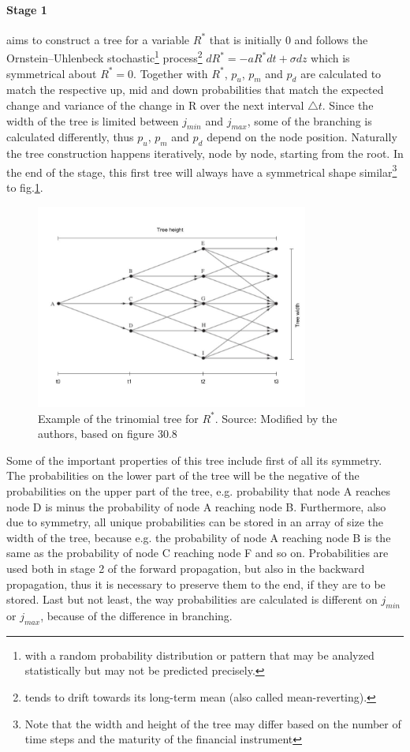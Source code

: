 \paragraph{Stage 1}
aims to construct a tree for a variable $R^*$ that is initially 0 and follows the Ornstein–Uhlenbeck stochastic\footnote{with a random probability distribution or pattern that may be analyzed statistically but may not be predicted precisely.} process\footnote{tends to drift towards its long-term mean (also called mean-reverting).} $dR^*=-aR^*dt + \sigma dz$ which is symmetrical about $R^*=0$\cite[pg.698-699]{ofod}. Together with $R^*$, $p_u$, $p_m$ and $p_d$ are calculated to match the respective up, mid and down probabilities that match the expected change and variance of the change in R over the next interval $\triangle t$. Since the width of the tree is limited between $j_{min}$ and $j_{max}$, some of the branching is calculated differently, thus $p_u$, $p_m$ and $p_d$ depend on the node position. Naturally the tree construction happens iteratively, node by node, starting from the root. In the end of the stage, this first tree will always have a symmetrical shape similar\footnote{Note that the width and height of the tree may differ based on the number of time steps and the maturity of the financial instrument} to fig.\ref{fig:treeconststage1}. 
\begin{figure}[H]
	\centering
	\includegraphics[width=0.8\textwidth]{img/treeconststage1wh.jpg}
	\caption{Example of the trinomial tree for $R^*$. Source: Modified by the authors, based on figure 30.8 \cite[pg. 699]{ofod}}
	\label{fig:treeconststage1}
\end{figure}

Some of the important properties of this tree include first of all its symmetry. The probabilities on the lower part of the tree will be the negative of the probabilities on the upper part of the tree, e.g. probability that node A reaches node D is minus the probability of node A reaching node B. Furthermore, also due to symmetry, all unique probabilities can be stored in an array of size the width of the tree, because e.g. the probability of node A reaching node B is the same as the probability of node C reaching node F and so on. Probabilities are used both in stage 2 of the forward propagation, but also in the backward propagation, thus it is necessary to preserve them to the end, if they are to be stored. Last but not least, the way probabilities are calculated is different on $j_{min}$ or $j_{max}$, because of the difference in branching. 

